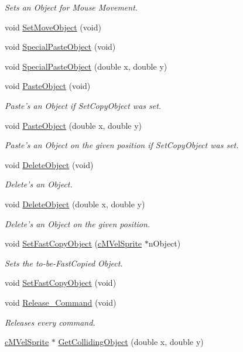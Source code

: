 \begin{DoxyCompactItemize}
\begin{DoxyCompactList}\small\item\em Sets an Object for Mouse Movement. \end{DoxyCompactList}\item 
void \hyperlink{classc_level_editor_a28f18b6d20e3539f9b8c320a0e21e9e9}{Set\-Move\-Object} (void)
\item 
void \hyperlink{classc_level_editor_a49f711bfd5620647747ff9f4d62f82fc}{Special\-Paste\-Object} (void)
\item 
void \hyperlink{classc_level_editor_a5b35ffea5da43e6bc6cfa3333e8849f3}{Special\-Paste\-Object} (double x, double y)
\item 
void \hyperlink{classc_level_editor_acfd849dfe4d7bb530bae57070b43cfba}{Paste\-Object} (void)
\begin{DoxyCompactList}\small\item\em Paste's an Object if Set\-Copy\-Object was set. \end{DoxyCompactList}\item 
void \hyperlink{classc_level_editor_ad871d716efedf1ef912108369197ff1e}{Paste\-Object} (double x, double y)
\begin{DoxyCompactList}\small\item\em Paste's an Object on the given position if Set\-Copy\-Object was set. \end{DoxyCompactList}\item 
void \hyperlink{classc_level_editor_a79bcddada39f11382b1231d12f8a4ab3}{Delete\-Object} (void)
\begin{DoxyCompactList}\small\item\em Delete's an Object. \end{DoxyCompactList}\item 
void \hyperlink{classc_level_editor_a1b9af1f9a24262b5157f2554862a8ef4}{Delete\-Object} (double x, double y)
\begin{DoxyCompactList}\small\item\em Delete's an Object on the given position. \end{DoxyCompactList}\item 
void \hyperlink{classc_level_editor_addf80b4ace57d10b00d8e4333df36607}{Set\-Fast\-Copy\-Object} (\hyperlink{classc_m_vel_sprite}{c\-M\-Vel\-Sprite} $\ast$n\-Object)
\begin{DoxyCompactList}\small\item\em Sets the to-\/be-\/\-Fast\-Copied Object. \end{DoxyCompactList}\item 
void \hyperlink{classc_level_editor_a3c4121e2556c4a8317efb6ebf7844f07}{Set\-Fast\-Copy\-Object} (void)
\item 
void \hyperlink{classc_level_editor_a665be4b34d4ab1cedbadec57db08267d}{Release\-\_\-\-Command} (void)
\begin{DoxyCompactList}\small\item\em Releases every command. \end{DoxyCompactList}\item 
\hyperlink{classc_m_vel_sprite}{c\-M\-Vel\-Sprite} $\ast$ \hyperlink{classc_level_editor_a70117cddc85118e26f7088c264847347}{Get\-Colliding\-Object} (double x, double y)
\end{DoxyCompactItemize}
